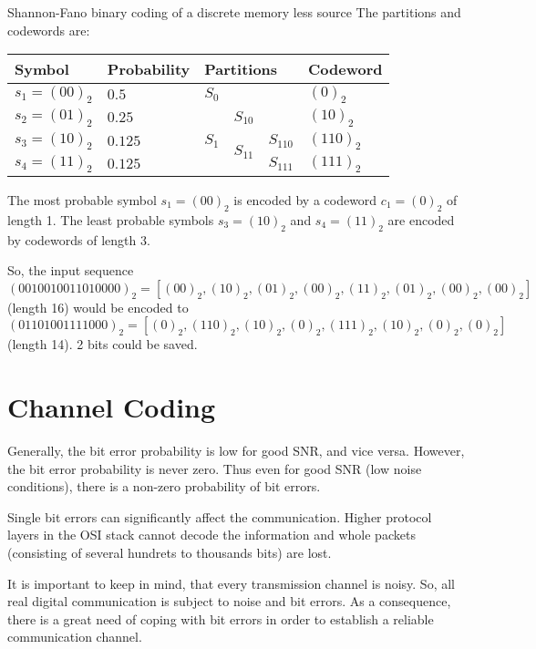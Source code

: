 \begin{refsection}
\begin{example}{Shannon-Fano binary coding of a discrete memory less source}
	The partitions and codewords are:
	\begin{table}[H]
		\centering
		\begin{tabular}{|l|l|l|l|l|l|}
			\hline
			Symbol & Probability & \multicolumn{3}{l|}{Partitions} & Codeword \\
			\hline
			\hline
			$s_1 = (00)_2$ & $0.5$ & \multicolumn{3}{l|}{$S_0$} & $(0)_2$ \\
			\hline
			$s_2 = (01)_2$ & $0.25$ & \multirow{3}{*}{$S_1$} & \multicolumn{2}{l|}{$S_{10}$} & $(10)_2$ \\
			\cline{1-2}\cline{4-6}
			$s_3 = (10)_2$ & $0.125$ & & \multirow{2}{*}{$S_{11}$} & $S_{110}$ & $(110)_2$ \\
			\cline{1-2}\cline{5-6}
			$s_4 = (11)_2$ & $0.125$ & & & $S_{111}$ & $(111)_2$ \\
			\hline
		\end{tabular}
	\end{table}

	The most probable symbol $s_1 = (00)_2$ is encoded by a codeword $c_1 = (0)_2$ of length 1. The least probable symbols $s_3 = (10)_2$ and $s_4 = (11)_2$ are encoded by codewords of length 3.
	
	So, the input sequence $(0010010011010000)_2 = [(00)_2, (10)_2, (01)_2, (00)_2, (11)_2, (01)_2, (00)_2, (00)_2]$ (length 16) would be encoded to $(01101001111000)_2 = [(0)_2, (110)_2, (10)_2, (0)_2, (111)_2, (10)_2, (0)_2, (0)_2]$ (length 14). 2 bits could be saved.
\end{example}

\section{Channel Coding}

Generally, the bit error probability is low for good \ac{SNR}, and vice versa. However, the bit error probability is never zero. Thus even for good \ac{SNR} (low noise conditions), there is a non-zero probability of bit errors.

Single bit errors can significantly affect the communication. Higher protocol layers in the \ac{OSI} stack cannot decode the information and whole packets (consisting of several hundrets to thousands bits) are lost.

It is important to keep in mind, that every transmission channel is noisy. So, all real digital communication is subject to noise and bit errors. As a consequence, there is a great need of coping with bit errors in order to establish a reliable communication channel.


\end{refsection}
